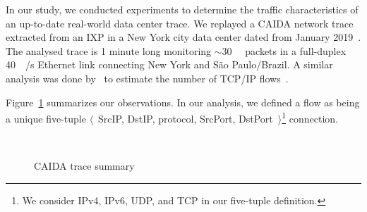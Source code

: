In our study, we conducted experiments to determine the traffic characteristics of an up-to-date real-world data center trace.
We replayed a CAIDA network trace extracted from an IXP in a New York city data center dated from January 2019~\cite{caida:19}.
The analysed trace is 1 minute long monitoring $\sim$\SI{30}{\mega\nothing} packets in a full-duplex \SI{40}{\giga\bit/\second} Ethernet link connecting New York and S\~ao Paulo/Brazil.
A similar analysis was done by~\citeauthor{Spang:19} to estimate the number of TCP/IP flows~\cite{Spang:19}.

Figure~\ref{fig:traces} summarizes our observations.
In our analysis, we defined a flow as being a unique five-tuple $\langle$~SrcIP, DstIP, protocol, SrcPort, DstPort~$\rangle$\footnote{We consider IPv4, IPv6, UDP, and TCP in our five-tuple definition.} connection.

\begin{figure}[!t]
		\centering
		\qquad
		\\
		\qquad
		\caption{CAIDA trace summary}
		\label{fig:traces}
\end{figure}

